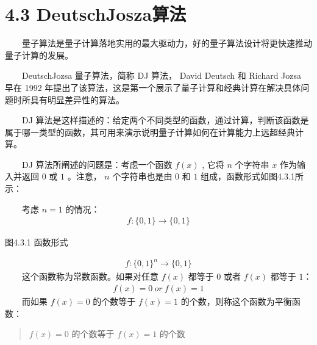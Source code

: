 \documentclass[a4paper,11pt,english]{sphinxmanual}
\begin{document}
\sphinxstepscope


\section{4.3 Deutsch\sphinxhyphen{}Josza算法}
\label{\detokenize{rst/4.3Deutsch-Josza_u7b97_u6cd5:deutsch-josza}}\label{\detokenize{rst/4.3Deutsch-Josza_u7b97_u6cd5::doc}}
\sphinxAtStartPar
  量子算法是量子计算落地实用的最大驱动力，好的量子算法设计将更快速推动量子计算的发展。

\sphinxAtStartPar
  Deutsch\sphinxhyphen{}Jozsa 量子算法，简称 D\sphinxhyphen{}J 算法， David Deutsch 和 Richard Jozsa 早在 1992 年提出了该算法，这是第一个展示了量子计算和经典计算在解决具体问题时所具有明显差异性的算法。

\sphinxAtStartPar
  D\sphinxhyphen{}J 算法是这样描述的：给定两个不同类型的函数，通过计算，判断该函数是属于哪一类型的函数，其可用来演示说明量子计算如何在计算能力上远超经典计算。

\sphinxAtStartPar
  D\sphinxhyphen{}J 算法所阐述的问题是：考虑一个函数 \(f(x)\) , 它将  \(n\)  个字符串  \(x\) 作为输入并返回  \(0\) 或  \(1\) 。注意， \(n\) 个字符串也是由 \(0\) 和 \(1\) 组成，函数形式如图4.3.1所示：

\sphinxAtStartPar
  考虑 \(n=1\) 的情况：
\begin{equation*}
\begin{split}f:\{0,1\} \rightarrow\{0,1\}\end{split}
\end{equation*}

\begin{center}图4.3.1 函数形式
\end{center}\begin{equation*}
\begin{split}f:\{0,1\}^{n} \rightarrow\{0,1\}\end{split}
\end{equation*}
\sphinxAtStartPar
  这个函数称为常数函数。如果对任意 \(f(x)\) 都等于 \(0\) 或者 \(f(x)\) 都等于 \(1\) ​：
\begin{equation*}
\begin{split}f(x) =0 \ or \ f(x) = 1\end{split}
\end{equation*}
\sphinxAtStartPar
  而如果 \(f(x) = 0\) 的个数等于 \(f(x) = 1\) 的个数，则称这个函数为平衡函数：
\begin{quote}

\sphinxAtStartPar
\(f(x) =0\) 的个数等于 \(f(x) = 1\) 的个数
\end{quote}
\end{document}
